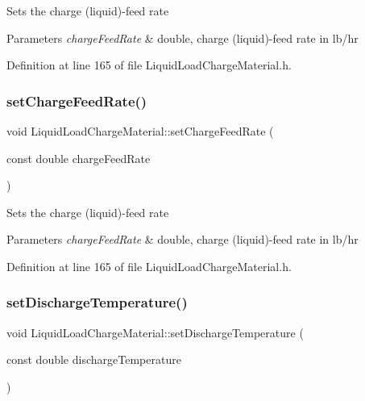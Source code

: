 Sets the charge (liquid)-\/feed rate 
\begin{DoxyParams}{Parameters}
{\em charge\+Feed\+Rate} & double, charge (liquid)-\/feed rate in lb/hr \\
\hline
\end{DoxyParams}


Definition at line 165 of file Liquid\+Load\+Charge\+Material.\+h.

\mbox{\label{class_liquid_load_charge_material_a23d6aa6f15a124ddb1504261347b0b82}} 
\subsubsection{\texorpdfstring{set\+Charge\+Feed\+Rate()}{setChargeFeedRate()}\hspace{0.1cm}{\footnotesize\ttfamily [3/3]}}
{\footnotesize\ttfamily void Liquid\+Load\+Charge\+Material\+::set\+Charge\+Feed\+Rate (\begin{DoxyParamCaption}\item[{const double}]{charge\+Feed\+Rate }\end{DoxyParamCaption})\hspace{0.3cm}{\ttfamily [inline]}}

Sets the charge (liquid)-\/feed rate 
\begin{DoxyParams}{Parameters}
{\em charge\+Feed\+Rate} & double, charge (liquid)-\/feed rate in lb/hr \\
\hline
\end{DoxyParams}


Definition at line 165 of file Liquid\+Load\+Charge\+Material.\+h.

\mbox{\label{class_liquid_load_charge_material_a04ef0778e524f531b6dd2dd6137c270d}} 
\subsubsection{\texorpdfstring{set\+Discharge\+Temperature()}{setDischargeTemperature()}\hspace{0.1cm}{\footnotesize\ttfamily [1/3]}}
{\footnotesize\ttfamily void Liquid\+Load\+Charge\+Material\+::set\+Discharge\+Temperature (\begin{DoxyParamCaption}\item[{const double}]{discharge\+Temperature }\end{DoxyParamCaption})\hspace{0.3cm}{\ttfamily [inline]}}

